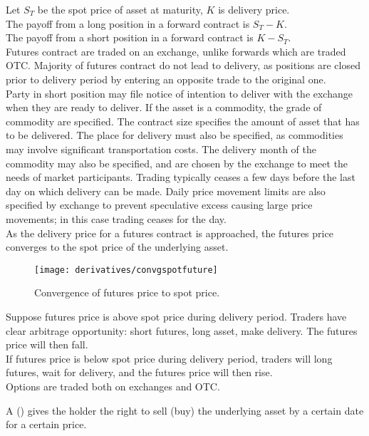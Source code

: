 Let $S_T$ be the spot price of asset at maturity, $K$ is delivery price.\\
The payoff from a long position in a forward contract is $S_T - K$.\\
The payoff from a short position in a forward contract is $K - S_T$.\\

Futures contract are traded on an exchange, unlike forwards which are traded OTC. Majority of futures contract do not lead to delivery, as positions are closed prior to delivery period by entering an opposite trade to the original one.\\

Party in short position may file notice of intention to deliver with the exchange when they are ready to deliver. If the asset is a commodity, the grade of commodity are specified. The contract size specifies the amount of asset that has to be delivered. The place for delivery must also be specified, as commodities may involve significant transportation costs. The delivery month of the commodity may also be specified, and are chosen by the exchange to meet the needs of market participants. Trading typically ceases a few days before the last day on which delivery can be made. Daily price movement limits are also specified by exchange to prevent speculative excess causing large price movements; in this case trading ceases for the day.\\

As the delivery price for a futures contract is approached, the futures price converges to the spot price of the underlying asset.
\begin{figure}[H]
\centering
\texttt{[image: derivatives/convgspotfuture]}
\caption{Convergence of futures price to spot price.}
\end{figure}

Suppose futures price is above spot price during delivery period. Traders have clear arbitrage opportunity: short futures, long asset, make delivery. The futures price will then fall.\\
If futures price is below spot price during delivery period, traders will long futures, wait for delivery, and the futures price will then rise.\\

Options are traded both on exchanges and OTC.

\begin{definition} A  () gives the holder the right to sell (buy) the underlying asset by a certain date for a certain price.
\end{definition}

